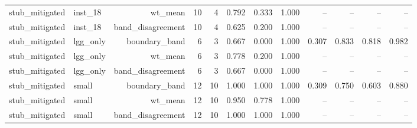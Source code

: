 \begin{table}[t]
\begin{tabular}{llrrrrrrrrrr}
stub\_mitigated & inst\_18 & wt\_mean & 10 & 4 & 0.792 & 0.333 & 1.000 & – & – & – & – \\
stub\_mitigated & inst\_18 & band\_disagreement & 10 & 4 & 0.625 & 0.200 & 1.000 & – & – & – & – \\
stub\_mitigated & lgg\_only & boundary\_band & 6 & 3 & 0.667 & 0.000 & 1.000 & 0.307 & 0.833 & 0.818 & 0.982 \\
stub\_mitigated & lgg\_only & wt\_mean & 6 & 3 & 0.778 & 0.200 & 1.000 & – & – & – & – \\
stub\_mitigated & lgg\_only & band\_disagreement & 6 & 3 & 0.667 & 0.000 & 1.000 & – & – & – & – \\
stub\_mitigated & small & boundary\_band & 12 & 10 & 1.000 & 1.000 & 1.000 & 0.309 & 0.750 & 0.603 & 0.880 \\
stub\_mitigated & small & wt\_mean & 12 & 10 & 0.950 & 0.778 & 1.000 & – & – & – & – \\
stub\_mitigated & small & band\_disagreement & 12 & 10 & 1.000 & 1.000 & 1.000 & – & – & – & – \\
\hline
\end{tabular}
\end{table}
